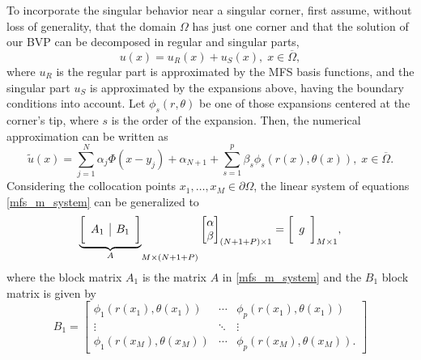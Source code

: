 To incorporate the singular behavior near a singular corner, first assume, without loss of generality, that the domain \(\Omega\) has just one corner and that the solution of our \ac{BVP} can be decomposed in regular and singular parts,
\[
    u(x) = u_R(x) + u_S(x), \; x \in \overline{\Omega},
\]
where \(u_R\) is the regular part is approximated by the MFS basis functions, and the singular part \(u_S\) is approximated by the expansions above, having the boundary conditions into account. Let \(\phi_s(r, \theta)\) be one of those expansions centered at the corner's tip, where \(s\) is the order of the expansion. Then, the numerical approximation can be written as
\begin{equation}
    \tilde{u}(x) = \sum_{j=1}^{N}\alpha_j \Phi(x-y_j) + \alpha_{N+1} + \sum_{s=1}^{p} \beta_s \phi_s(r(x),\theta(x)), \; x \in \overline{\Omega}.
\end{equation}
Considering the collocation points \(x_1,\dots,x_M \in \partial \Omega\), the linear system of equations \eqref{mfs_m_system} can be generalized to
\begin{equation}
    {\underbrace{\bigg[ \begin{array}{c | c}
        A_1 & B_1 \\
    \end{array} \bigg]}_{A}}_{M\times(N+1+P)}
    \begin{bmatrix}
        \alpha\\
        \beta
    \end{bmatrix}_{(N+1+P)\times 1}
    =
    \bigg[ \begin{array}{c}
        g \\
    \end{array} \bigg]_{M\times 1},
\end{equation}
where the block matrix \(A_1\) is the matrix \(A\) in \eqref{mfs_m_system} and the \(B_1\) block matrix is given by
\[
    B_1=\begin{bmatrix}
        \phi_1(r(x_1), \theta(x_1)) & \cdots & \phi_p(r(x_1), \theta(x_1)) \\
        \vdots & \ddots & \vdots\\
        \phi_1(r(x_M), \theta(x_M)) & \cdots & \phi_p(r(x_M), \theta(x_M)).
    \end{bmatrix}
\]


